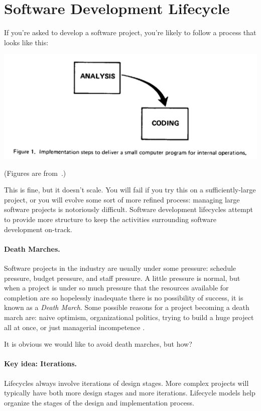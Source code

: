 




\section*{Software Development Lifecycle}
If you're asked to develop a software project, you're likely to follow
a process that looks like this:

\begin{center}
\includegraphics[width=.5\textwidth]{images/two-stages.png}
\end{center}

\noindent
(Figures are from~\cite{royce70:_manag_devel_large_softw_system}.)

This is fine, but it doesn't scale. You will fail if you try this on a
sufficiently-large project, or you will evolve some sort of more
refined process: managing large software projects is notoriously
difficult.  Software development lifecycles attempt to provide more
structure to keep the activities surrounding software development
on-track.

\paragraph{Death Marches.} Software projects in the industry are usually under some pressure: schedule pressure, budget pressure, and staff pressure. A little pressure is normal, but when a project is under so much pressure that the resources available for completion are so hopelessly inadequate there is no possibility of success, it is known as a \textit{Death March}. Some possible reasons for a project becoming a death march are: naive optimism, organizational politics, trying to build a huge project all at once, or just managerial incompetence \cite{DeathMarch}.

It is obvious we would like to avoid death marches, but how?

\paragraph{Key idea: Iterations.} Lifecycles always involve iterations of design
stages. More complex projects will typically have both more design stages
and more iterations. Lifecycle models help organize the stages of the design and implementation
process.

